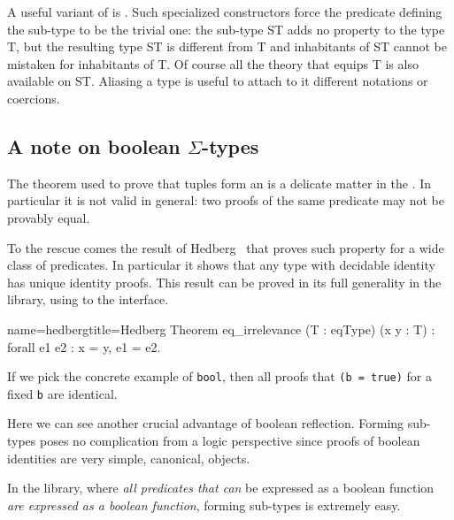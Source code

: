 A useful variant of  is .
Such specialized constructors force the predicate defining the
sub-type to be the trivial one: the sub-type ST adds no property to
the type T, but the resulting type ST is different from T and
inhabitants of ST cannot be mistaken for inhabitants of T.  Of course
all the theory that equips T is also available on ST.  Aliasing a
type is useful to attach to it different notations or coercions.

\subsection{A note on boolean $\Sigma$-types\label{hedberg}}

The  theorem used to prove that tuples form an
 is a delicate matter in the \mcbCIC{}.  In particular it
is not valid in general: two proofs of the same predicate may not be
provably equal.

To the rescue comes the result of Hedberg~\cite{Hedberg}
that proves such property for a wide class of predicates.
In particular it shows that any type with decidable identity
has unique identity proofs. This result can be proved in its full generality
in the \mcbMC{} library, using to the  interface.

\begin{coq}{name=hedberg}{title=Hedberg}
Theorem eq_irrelevance (T : eqType) (x y : T) : forall e1 e2 : x = y, e1 = e2.
\end{coq}

If we pick the concrete example of \lstinline/bool/,
then all proofs that \lstinline/(b = true)/
for a fixed \lstinline/b/ are identical.

Here we can see another crucial advantage of boolean reflection.
Forming sub-types poses no complication from a logic perspective since
proofs of boolean identities are very simple, canonical, objects.

In the \mcbMC{} library, where \emph{all predicates that can} be
expressed as a boolean function \emph{are expressed as a boolean
function}, forming sub-types is extremely easy.


